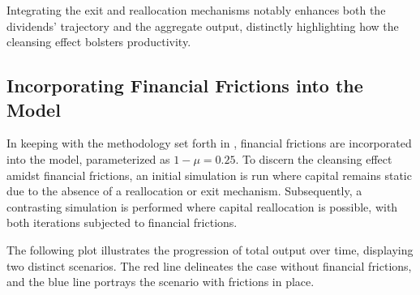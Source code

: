 \documentclass[12pt]{report}
\begin{document}
Integrating the exit and reallocation mechanisms notably enhances both the dividends' trajectory and the aggregate
output, distinctly highlighting how the cleansing effect bolsters productivity. 


\subsection{Incorporating Financial Frictions into the Model}


In keeping with the methodology set forth in \cite{OsePap17}, financial frictions are incorporated into the model,
parameterized as  \(1-\mu = 0.25\). To discern the cleansing effect amidst financial frictions, an initial simulation is
run where capital remains static due to the absence of a reallocation or exit mechanism. Subsequently, a contrasting
simulation is performed where capital reallocation is possible, with both iterations subjected to financial frictions.

The following plot illustrates the progression of total output over time, displaying two distinct scenarios. The red
line delineates the case without financial frictions, and the blue line portrays the scenario with frictions in place.

\end{document}
